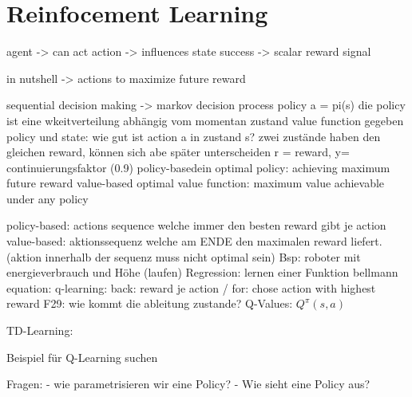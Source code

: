 \section{Reinfocement Learning}
\label{sect:reinforcement-learning}

agent -> can act
action -> influences state
success -> scalar reward signal

in nutshell -> actions to maximize future reward

sequential decision making
	-> 
markov decision process
policy a = pi(s)
	die policy ist eine wkeitverteilung abhängig vom momentan zustand
value function
	gegeben policy und state: wie gut ist action a in zustand s?
	zwei zustände haben den gleichen reward, können sich abe später unterscheiden
	r = reward, y= continuierungsfaktor (0.9)
policy-basedein
	optimal policy: achieving maximum future reward
value-based
	optimal value function: maximum value achievable under any policy

policy-based: actions sequence welche immer den besten reward gibt je action
value-based: aktionssequenz welche am ENDE den maximalen reward liefert. (aktion innerhalb der sequenz muss nicht optimal sein)
Bsp: roboter mit energieverbrauch und Höhe (laufen)
Regression: lernen einer Funktion
bellmann equation: 
q-learning: back: reward je action / for: chose action with highest reward
F29: wie kommt die ableitung zustande?
Q-Values: $Q^\pi(s,a)$

TD-Learning:

Beispiel für Q-Learning suchen
	
	
Fragen:
- wie parametrisieren wir eine Policy?
- Wie sieht eine Policy aus?
